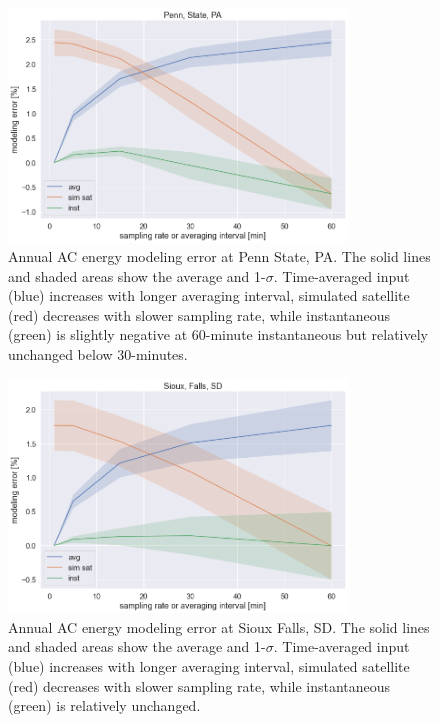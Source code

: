 \documentclass[conference]{IEEEtran}
\begin{document}
\begin{figure}[htbp]
\centerline{\includegraphics[width=9cm]{analysis/psu_all.png}}
\caption{Annual AC energy modeling error at Penn State, PA. The solid lines and shaded areas show the average and 1-$\sigma$. Time-averaged input (blue) increases with longer averaging interval, simulated satellite (red) decreases with slower sampling rate, while instantaneous (green) is slightly negative at 60-minute instantaneous but relatively unchanged below 30-minutes.}
\label{fig:psu2010}
\end{figure}

\begin{figure}[htbp]
\centerline{\includegraphics[width=9cm]{analysis/sxf_all.png}}
\caption{Annual AC energy modeling error at Sioux Falls, SD. The solid lines and shaded areas show the average and 1-$\sigma$. Time-averaged input (blue) increases with longer averaging interval, simulated satellite (red) decreases with slower sampling rate, while instantaneous (green) is relatively unchanged.}
\label{fig:sxf2009}
\end{figure}
\end{document}

